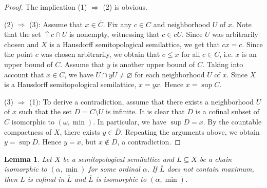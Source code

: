 \documentclass[12pt, twoside, leqno]{article}
\newtheorem{theorem}{Theorem}[section]
\newtheorem{lemma}[theorem]{Lemma}
\theoremstyle{definition}
\numberwithin{equation}{section}
\newcommand{\w}{\omega}
\newcommand{\Ra}{\Rightarrow}
\begin{document}
\begin{proof}

The implication (1) $\Rightarrow$ (2) is obvious. 

(2) $\Ra$ (3): Assume that $x\in \overline C$. Fix any $c\in C$ and neighborhood $U$ of $x$. Note that the set ${\uparrow}c\cap U$ is nonempty, witnessing that $c\in cU$. Since $U$ was arbitrarily chosen and $X$ is a Hausdorff semitopological semilattice, we get that $cx=c$. Since the point $c$ was chosen arbitrarily, we obtain that $c\leq x$ for all $c\in C$, i.e. $x$ is an upper bound of $C$. Assume that $y$ is another upper bound of $C$. Taking into account that $x\in\overline{C}$,  we have $U\cap yU\neq \varnothing$ for each neighborhood $U$ of $x$. Since $X$ is a Hausdorff semitopological semilattice, $x=yx$. Hence $x=\sup C$. 

(3) $\Ra$ (1):  To derive a contradiction, assume that there exists a neighborhood $U$ of $x$ such that the set $D=C\setminus U$ is infinite. It is clear that $D$ is a cofinal subset of $C$ isomorphic to $(\w,\min)$. In particular, we have $\sup D=x$. By the countable compactness of $X$, there exists $y\in \overline D$. Repeating the arguments above, we obtain $y=\sup D$. Hence $y=x$, but $x\notin \overline{D}$, a contradiction.
\end{proof}





    


\begin{lemma}\label{+1}
Let $X$ be a semitopological semilattice and $L\subseteq X$ be a chain isomorphic to $(\alpha,\min)$ for some ordinal $\alpha$. If $\overline{L}$ does not contain maximum, then $L$ is cofinal in $\overline{L}$ and $\overline{L}$ is isomorphic to $(\alpha,\min)$.    
\end{lemma}  
\end{document}

